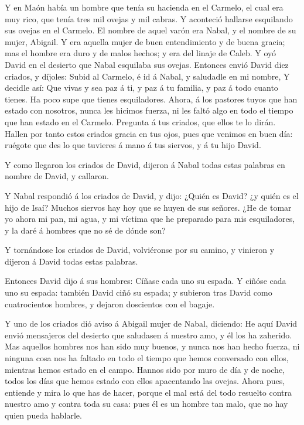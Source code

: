  Y en Maón había un hombre que tenía su hacienda en el
Carmelo, el cual era muy rico, que tenía tres mil ovejas y mil cabras. Y
aconteció hallarse esquilando sus ovejas en el Carmelo.  El
nombre de aquel varón era Nabal, y el nombre de su mujer, Abigail. Y era
aquella mujer de buen entendimiento y de buena gracia; mas el hombre era
duro y de malos hechos; y era del linaje de Caleb.  Y oyó
David en el desierto que Nabal esquilaba sus ovejas. 
Entonces envió David diez criados, y díjoles: Subid al Carmelo, é id á
Nabal, y saludadle en mi nombre,  Y decidle así: Que vivas y
sea paz á ti, y paz á tu familia, y paz á todo cuanto tienes.
 Ha poco supe que tienes esquiladores. Ahora, á los pastores
tuyos que han estado con nosotros, nunca les hicimos fuerza, ni les
faltó algo en todo el tiempo que han estado en el Carmelo. 
Pregunta á tus criados, que ellos te lo dirán. Hallen por tanto estos
criados gracia en tus ojos, pues que venimos en buen día: ruégote que
des lo que tuvieres á mano á tus siervos, y á tu hijo David.

 Y como llegaron los criados de David, dijeron á Nabal todas
estas palabras en nombre de David, y callaron.

 Y Nabal respondió á los criados de David, y dijo: ¿Quién
es David? ¿y quién es el hijo de Isaí? Muchos siervos hay hoy que se
huyen de sus señores.  ¿He de tomar yo ahora mi pan, mi
agua, y mi víctima que he preparado para mis esquiladores, y la daré á
hombres que no sé de dónde son?

 Y tornándose los criados de David, volviéronse por su
camino, y vinieron y dijeron á David todas estas palabras.

 Entonces David dijo á sus hombres: Cíñase cada uno su
espada. Y ciñóse cada uno su espada: también David ciñó su espada; y
subieron tras David como cuatrocientos hombres, y dejaron doscientos con
el bagaje.

 Y uno de los criados dió aviso á Abigail mujer de Nabal,
diciendo: He aquí David envió mensajeros del desierto que saludasen á
nuestro amo, y él los ha zaherido.  Mas aquellos hombres
nos han sido muy buenos, y nunca nos han hecho fuerza, ni ninguna cosa
nos ha faltado en todo el tiempo que hemos conversado con ellos,
mientras hemos estado en el campo.  Hannos sido por muro de
día y de noche, todos los días que hemos estado con ellos apacentando
las ovejas.  Ahora pues, entiende y mira lo que has de
hacer, porque el mal está del todo resuelto contra nuestro amo y contra
toda su casa: pues él es un hombre tan malo, que no hay quien pueda
hablarle.

